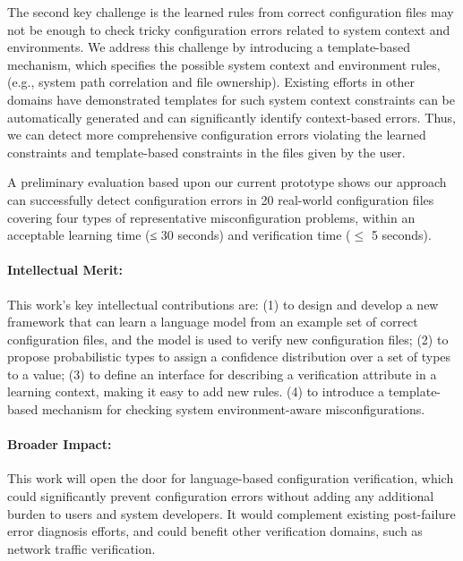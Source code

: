 The second key challenge is the learned rules from correct configuration files may not be enough to check tricky configuration errors related to system context and environments. 
We address this challenge by introducing a template-based mechanism, which specifies the possible system context and environment rules, (e.g., system path correlation and file ownership).
Existing efforts in other domains have demonstrated templates for such system context constraints can be automatically generated and can significantly identify context-based errors.
Thus, we can detect more comprehensive configuration errors violating the learned constraints and template-based constraints in the files given by the user.

A preliminary evaluation based upon our current prototype shows our approach can successfully detect configuration errors in 20 real-world configuration files covering four types of representative misconfiguration problems, within an acceptable learning time (≤ 30 seconds) and verification time ($\le$ 5 seconds).

\paragraph{Intellectual Merit:} This work’s key intellectual contributions are: 
   (1) to design and develop a new framework that can learn a language model from an example set of correct configuration files, and the model is used to verify new configuration files;
   (2) to propose probabilistic types to assign a confidence distribution over a set of types to a value; 
   (3) to define an interface for describing a verification attribute in a learning context, making it easy to add new rules.
   (4) to introduce a template-based mechanism for checking system environment-aware misconfigurations.

\paragraph{Broader Impact:} This work will open the door for language-based configuration verification, which could significantly prevent configuration errors without adding any additional burden to users and system developers. It would complement existing post-failure error diagnosis efforts, and could benefit other verification domains, such as network traffic verification. 


